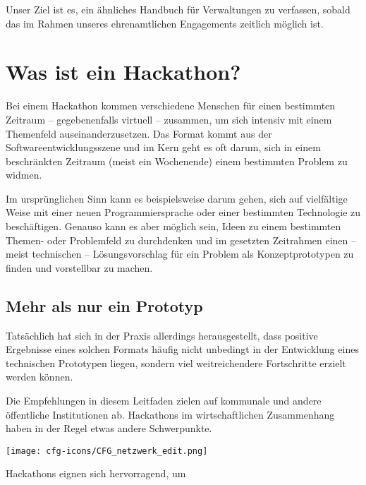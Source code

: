 Unser Ziel ist es, ein ähnliches Handbuch für Verwaltungen zu verfassen, sobald das im Rahmen unseres ehrenamtlichen Engagements zeitlich möglich ist.

\newpage

\chapter{Was ist ein Hackathon?}

Bei einem Hackathon kommen verschiedene Menschen für einen bestimmten Zeitraum – gegebenenfalls virtuell – zusammen, um sich intensiv mit einem Themenfeld auseinanderzusetzen. Das Format kommt aus der Softwareentwicklungsszene und im Kern geht es oft darum, sich in einem beschränkten Zeitraum (meist ein Wochenende) einem bestimmten Problem zu widmen.

Im ursprünglichen Sinn kann es beispielsweise darum gehen, sich auf vielfältige Weise mit einer neuen Programmiersprache oder einer bestimmten Technologie zu beschäftigen. Genauso kann es aber möglich sein, Ideen zu einem bestimmten Themen- oder Problemfeld zu durchdenken und im gesetzten Zeitrahmen einen – meist technischen – Lösungsvorschlag für ein Problem als Konzeptprototypen zu finden und vorstellbar zu machen.


\section*{Mehr als nur ein Prototyp}

Tatsächlich hat sich in der Praxis allerdings herausgestellt, dass positive Ergebnisse eines solchen Formats häufig nicht unbedingt in der Entwicklung eines technischen Prototypen liegen, sondern viel weitreichendere Fortschritte erzielt werden können.

Die Empfehlungen in diesem Leitfaden zielen auf kommunale und andere öffentliche Institutionen ab. Hackathons im wirtschaftlichen Zusammenhang haben in der Regel etwas andere Schwerpunkte.

\begin{marginfigure}[-10.5cm]
	\texttt{[image: cfg-icons/CFG\_netzwerk\_edit.png]}
\end{marginfigure}

Hackathons eignen sich hervorragend, um

